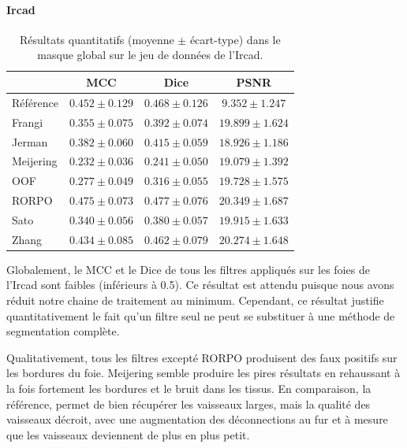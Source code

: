 \paragraph{Ircad}

\begin{table}[!ht]
  \begin{center}
      \caption{Résultats quantitatifs (moyenne $\pm$ écart-type) dans le masque global \maskglobal sur le jeu de données de l'Ircad.}
      \label{Table:quantitative results Ircad}
      \begin{tabular}{lccc}
          \hline
          & MCC & Dice & PSNR \\ 
          \hline
          Référence	& $ 0.452 \pm 0.129	$ & $ 0.468 \pm	0.126 $ & $	9.352  \pm  1.247 $ \\
          Frangi	    & $ 0.355 \pm 0.075	$ & $ 0.392 \pm	0.074 $ & $	19.899 \pm 	1.624 $ \\
          Jerman	    & $ 0.382 \pm 0.060	$ & $ 0.415 \pm	0.059 $ & $	18.926 \pm 	1.186 $ \\
          Meijering   & $ 0.232 \pm 0.036	$ & $ 0.241 \pm	0.050 $ & $	19.079 \pm 	1.392 $ \\
          OOF	        & $ 0.277 \pm 0.049	$ & $ 0.316 \pm	0.055 $ & $	19.728 \pm 	1.575 $ \\
          RORPO	    & $ 0.475 \pm 0.073	$ & $ 0.477 \pm	0.076 $ & $	20.349 \pm 	1.687 $ \\
          Sato	    & $ 0.340 \pm 0.056	$ & $ 0.380 \pm	0.057 $ & $	19.915 \pm 	1.633 $ \\
          Zhang	    & $ 0.434 \pm 0.085	$ & $ 0.462 \pm	0.079 $ & $	20.274 \pm 	1.648 $ \\
    
          \hline
      \end{tabular}  
      \end{center}    
\end{table}


Globalement, le MCC et le Dice de tous les filtres appliqués sur les foies de l'Ircad sont faibles (inférieurs à 0.5). Ce résultat est attendu puisque nous avons réduit notre chaine de traitement au minimum. Cependant, ce résultat justifie quantitativement le fait qu'un filtre seul ne peut se substituer à une méthode de segmentation complète.

Qualitativement, tous les filtres excepté RORPO produisent des faux positifs sur les bordures du foie. Meijering semble produire les pires résultats en rehaussant à la fois fortement les bordures et le bruit dans les tissus. En comparaison, la référence, permet de bien récupérer les vaisseaux larges, mais la qualité des vaisseaux décroit, avec une augmentation des déconnections au fur et à mesure que les vaisseaux deviennent de plus en plus petit. 

